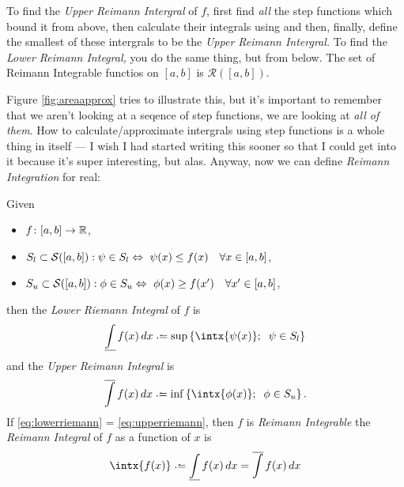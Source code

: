 \medskip
To find the \emph{Upper Reimann Intergral} of $f$, first find \emph{all} the step functions which bound it from above, then calculate their integrals using  and then, finally, define the smallest of these intergrals to be the \emph{Upper Reimann Intergral.} To find the \emph{Lower Reimann Integral,} you do the same thing, but from below. The set of Reimann Integrable functios on $[a,b]$ is $\mathcal{R}([a, b])$.

\medskip
Figure \ref{fig:areaapprox} tries to illustrate this, but it's important to remember that we aren't looking at a seqence of step functions, we are looking at \emph{all of them}. How to calculate/approximate intergrals using step functions is a whole thing in itself --- I wish I had started writing this sooner so that I could get into it because it's super interesting, but alas. Anyway, now we can define \emph{Reimann Integration} for real:

\begin{definition}
	Given  
	\begin{itemize}
	\item
		$f\colon [a, b] \rightarrow \mathbb{R}$,
	\item
		$S_l \subset \mathcal{S}([a, b]) : \psi \in S_l \Leftrightarrow \ \psi(x) \leq f(x) \quad \forall x \in [a, b] $,
	\item
		$S_u \subset \mathcal{S}([a, b]) : \phi \in S_u \Leftrightarrow \ \phi(x) \geq f(x') \quad \forall x' \in [a, b] $,
	\end{itemize}
	then the \emph{Lower Riemann Integral} of $f$ is
	\begin{equation}
		\underline {\int} \, f(x) \, dx \defeq \sup \left\{\intx{\psi(x)}; \;\; \psi \in S_l\right\}
		\label{eq:lowerriemann}
	\end{equation} 
	and the \emph{Upper Reimann Integral} is
	\begin{equation}
		\overline {\int} \, f(x) \, dx \defeq \inf \left\{\intx{\phi(x)}; \;\; \phi \in S_u\right\}.
		\label{eq:upperriemann}
	\end{equation}
	If \eqref{eq:lowerriemann} = \eqref{eq:upperriemann}, then $f$ is \emph{Reimann Integrable} the \emph{Reimann Integral} of $f$ as a function of $x$ is 
	\begin{equation}
		\intx{f(x)} \defeq \underline {\int} \, f(x) \, dx = \overline {\int} \, f(x) \, dx
	\end{equation}
\end{definition}

